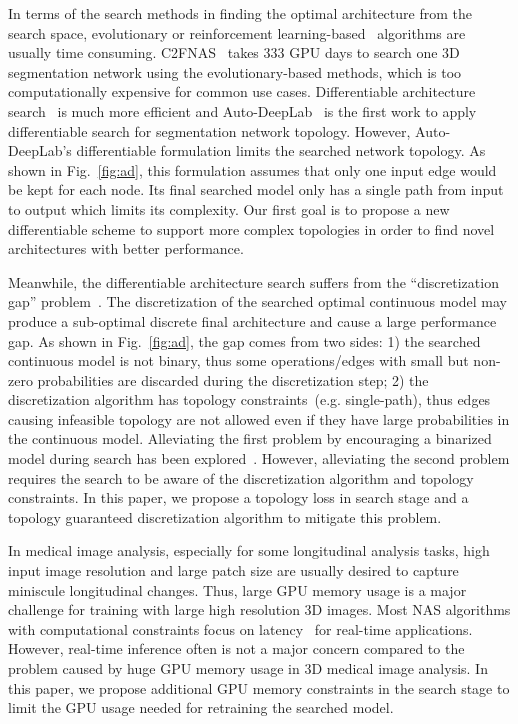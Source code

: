 \documentclass[final]{cvpr}
\begin{document}
In terms of the search methods in finding the optimal architecture from the search space,  evolutionary or reinforcement learning-based~\cite{zoph2016nas,real2019regularized} algorithms are usually time consuming. C2FNAS~\cite{yu2020c2fnas} takes 333 GPU days to search one 3D segmentation network using the evolutionary-based methods, which is too computationally expensive for common use cases. Differentiable architecture search~\cite{liu2018darts} is much more efficient and Auto-DeepLab~\cite{liu2019auto} is the first work to apply differentiable search for segmentation network topology. However, Auto-DeepLab's differentiable formulation limits the searched network topology. As shown in Fig.~\ref{fig:ad}, this formulation assumes that only one input edge would be kept for each node.  Its final searched model only has a single path from input to output which limits its complexity. Our first goal is to propose a new differentiable scheme to support more complex topologies in order to find novel architectures with better performance. 

Meanwhile, the differentiable architecture search suffers from the ``discretization gap'' problem~\cite{chen2019progressive,tian2020discretization}. The discretization of the searched optimal continuous model may produce a sub-optimal discrete final architecture and cause a large performance gap. As shown in Fig.~\ref{fig:ad}, the gap comes from two sides: 1) the searched continuous model is not binary, thus some operations/edges with small but non-zero probabilities are discarded during the discretization step; 2) the discretization algorithm has topology constraints~(e.g. single-path), thus edges causing infeasible topology are not allowed even if they have large probabilities in the continuous model. Alleviating the first problem by encouraging a binarized model during search has been explored~\cite{chu2019fair,tian2020discretization,nayman2019xnas}. However, alleviating the second problem requires the search to be aware of the discretization algorithm and topology constraints. In this paper, we propose a topology loss in search stage and a topology guaranteed discretization algorithm to mitigate this problem.  

In medical image analysis, especially for some longitudinal analysis tasks, high input image resolution and large patch size are usually desired to capture miniscule longitudinal changes. Thus, large GPU memory usage is a major challenge for training with large high resolution 3D images. Most NAS algorithms with computational constraints focus on latency~\cite{cai2018proxylessnas,chen2019fasterseg,li2019partial,Shaw_2019_ICCV} for real-time applications. However, real-time inference often is not a major concern compared to the problem caused by huge GPU memory usage in 3D medical image analysis. In this paper, we propose additional GPU memory constraints in the search stage to limit the GPU usage needed for retraining the searched model.
\end{document}
